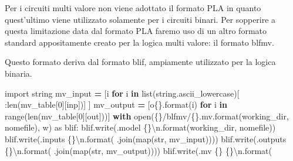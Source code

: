 \documentclass[
]{book}
\newenvironment{Shaded}{\begin{snugshade}}{\end{snugshade}}
\newcommand{\BuiltInTok}[1]{#1}
\newcommand{\CharTok}[1]{\textcolor[rgb]{0.31,0.60,0.02}{#1}}
\newcommand{\ControlFlowTok}[1]{\textcolor[rgb]{0.13,0.29,0.53}{\textbf{#1}}}
\newcommand{\DecValTok}[1]{\textcolor[rgb]{0.00,0.00,0.81}{#1}}
\newcommand{\ImportTok}[1]{#1}
\newcommand{\KeywordTok}[1]{\textcolor[rgb]{0.13,0.29,0.53}{\textbf{#1}}}
\newcommand{\NormalTok}[1]{#1}
\newcommand{\OperatorTok}[1]{\textcolor[rgb]{0.81,0.36,0.00}{\textbf{#1}}}
\newcommand{\SpecialCharTok}[1]{\textcolor[rgb]{0.00,0.00,0.00}{#1}}
\newcommand{\StringTok}[1]{\textcolor[rgb]{0.31,0.60,0.02}{#1}}
\begin{document}
Per i circuiti multi valore non viene adottato il formato PLA in quanto quest'ultimo viene utilizzato solamente per i circuiti binari. Per sopperire a questa limitazione data dal formato PLA faremo uso di un altro formato standard appositamente creato per la logica multi valore: il formato blfmv.

Questo formato deriva dal formato blif, ampiamente utilizzato per la logica binaria.

\begin{Shaded}
\begin{Highlighting}[]
\ImportTok{import}\NormalTok{ string}
\NormalTok{mv\_input }\OperatorTok{=}\NormalTok{ [i }\ControlFlowTok{for}\NormalTok{ i }\KeywordTok{in} \BuiltInTok{list}\NormalTok{(string.ascii\_lowercase)[}
\NormalTok{    :}\BuiltInTok{len}\NormalTok{(mv\_table[}\DecValTok{0}\NormalTok{][}\StringTok{\textquotesingle{}inp\textquotesingle{}}\NormalTok{])]}
\NormalTok{  ]}
\NormalTok{mv\_output }\OperatorTok{=}\NormalTok{ [}\StringTok{\textquotesingle{}o}\SpecialCharTok{\{\}}\StringTok{\textquotesingle{}}\NormalTok{.}\BuiltInTok{format}\NormalTok{(i) }\ControlFlowTok{for}\NormalTok{ i }\KeywordTok{in} \BuiltInTok{range}\NormalTok{(}\BuiltInTok{len}\NormalTok{(mv\_table[}\DecValTok{0}\NormalTok{][}\StringTok{\textquotesingle{}out\textquotesingle{}}\NormalTok{]))]}
\ControlFlowTok{with} \BuiltInTok{open}\NormalTok{(}\StringTok{\textquotesingle{}}\SpecialCharTok{\{\}}\StringTok{/blfmv/}\SpecialCharTok{\{\}}\StringTok{.mv\textquotesingle{}}\NormalTok{.}\BuiltInTok{format}\NormalTok{(working\_dir, nomefile), }\StringTok{\textquotesingle{}w\textquotesingle{}}\NormalTok{) }\ImportTok{as}\NormalTok{ blif:}
\NormalTok{  blif.write(}\StringTok{\textquotesingle{}.model }\SpecialCharTok{\{\}}\CharTok{\textbackslash{}n}\StringTok{\textquotesingle{}}\NormalTok{.}\BuiltInTok{format}\NormalTok{(working\_dir, nomefile))}
\NormalTok{  blif.write(}\StringTok{\textquotesingle{}.inputs }\SpecialCharTok{\{\}}\CharTok{\textbackslash{}n}\StringTok{\textquotesingle{}}\NormalTok{.}\BuiltInTok{format}\NormalTok{(}
      \StringTok{\textquotesingle{} \textquotesingle{}}\NormalTok{.join(}\BuiltInTok{map}\NormalTok{(}\BuiltInTok{str}\NormalTok{, mv\_input))))}
\NormalTok{  blif.write(}\StringTok{\textquotesingle{}.outputs }\SpecialCharTok{\{\}}\CharTok{\textbackslash{}n}\StringTok{\textquotesingle{}}\NormalTok{.}\BuiltInTok{format}\NormalTok{(}
      \StringTok{\textquotesingle{} \textquotesingle{}}\NormalTok{.join(}\BuiltInTok{map}\NormalTok{(}\BuiltInTok{str}\NormalTok{, mv\_output))))}
\NormalTok{  blif.write(}\StringTok{\textquotesingle{}.mv }\SpecialCharTok{\{\}}\StringTok{ }\SpecialCharTok{\{\}}\CharTok{\textbackslash{}n}\StringTok{\textquotesingle{}}\NormalTok{.}\BuiltInTok{format}\NormalTok{(}

\end{Highlighting}
\end{Shaded}
\end{document}
